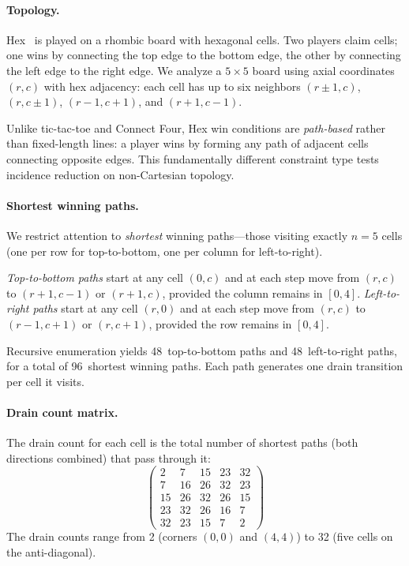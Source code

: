 \documentclass[11pt,a4paper]{article}
\begin{document}
\paragraph{Topology.}
Hex~\cite{gale1979} is played on a rhombic board with hexagonal cells.
Two players claim cells; one wins by connecting the top edge to the bottom edge, the other by connecting the left edge to the right edge.
We analyze a $5 \times 5$ board using axial coordinates $(r, c)$ with hex adjacency: each cell has up to six neighbors $(r \pm 1, c)$, $(r, c \pm 1)$, $(r-1, c+1)$, and $(r+1, c-1)$.

Unlike tic-tac-toe and Connect Four, Hex win conditions are \emph{path-based} rather than fixed-length lines: a player wins by forming any path of adjacent cells connecting opposite edges.
This fundamentally different constraint type tests incidence reduction on non-Cartesian topology.

\paragraph{Shortest winning paths.}
We restrict attention to \emph{shortest} winning paths---those visiting exactly $n = 5$ cells (one per row for top-to-bottom, one per column for left-to-right).

\emph{Top-to-bottom paths} start at any cell $(0, c)$ and at each step move from $(r, c)$ to $(r+1, c-1)$ or $(r+1, c)$, provided the column remains in $[0, 4]$.
\emph{Left-to-right paths} start at any cell $(r, 0)$ and at each step move from $(r, c)$ to $(r-1, c+1)$ or $(r, c+1)$, provided the row remains in $[0, 4]$.

Recursive enumeration yields 48~top-to-bottom paths and 48~left-to-right paths, for a total of 96~shortest winning paths.
Each path generates one drain transition per cell it visits.

\paragraph{Drain count matrix.}
The drain count for each cell is the total number of shortest paths (both directions combined) that pass through it:
\[
\begin{pmatrix}
2 & 7 & 15 & 23 & 32 \\
7 & 16 & 26 & 32 & 23 \\
15 & 26 & 32 & 26 & 15 \\
23 & 32 & 26 & 16 & 7 \\
32 & 23 & 15 & 7 & 2
\end{pmatrix}
\]
The drain counts range from 2 (corners $(0,0)$ and $(4,4)$) to 32 (five cells on the anti-diagonal).
\end{document}
